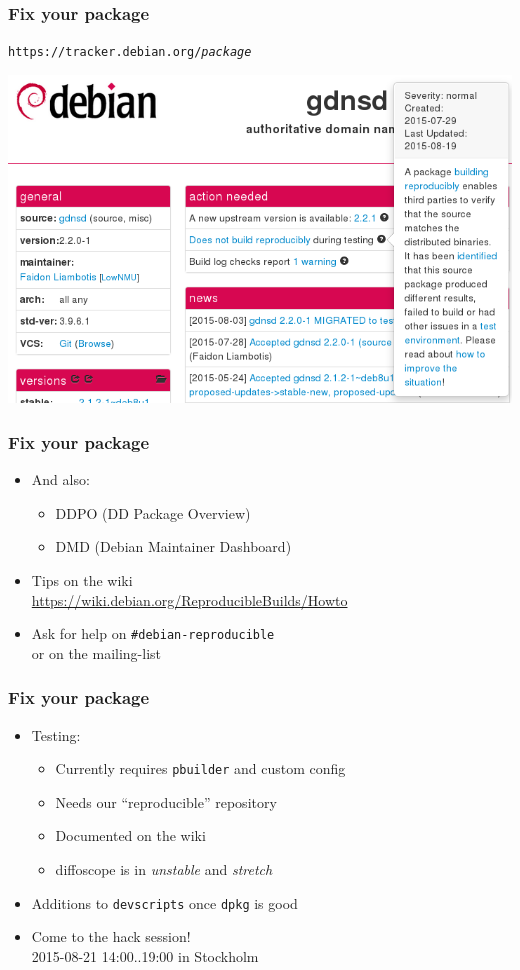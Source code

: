 \documentclass[14pt,aspectratio=169]{beamer}
\begin{document}
\begin{frame}
 \frametitle{Fix your package}

 \begin{center}
  \texttt{https://tracker.debian.org/\textit{package}}

  \includegraphics[width=0.8\linewidth]{images/tracker-gdnsd.png}
 \end{center}
\end{frame}

\begin{frame}
 \frametitle{Fix your package}

 \begin{itemize}
  \item And also:
   \begin{itemize}
    \item DDPO (DD Package Overview)
    \item DMD (Debian Maintainer Dashboard)
   \end{itemize}
  \item Tips on the wiki \\
   {\small \url{https://wiki.debian.org/ReproducibleBuilds/Howto}}
  \item Ask for help on \texttt{\#debian-reproducible} \\
   or on the mailing-list
 \end{itemize}
\end{frame}

\begin{frame}
 \frametitle{Fix your package}

 \begin{itemize}
  \item Testing:
   \begin{itemize}
    \item Currently requires \texttt{pbuilder} and custom config
    \item Needs our “reproducible” repository
    \item Documented on the wiki
    \item diffoscope is in \textit{unstable} and \textit{stretch}
   \end{itemize}
  \item Additions to \texttt{devscripts} once \texttt{dpkg} is good
  \item Come to the hack session! \\
    2015-08-21 14:00..19:00 in Stockholm
 \end{itemize}
\end{frame}
\end{document}
